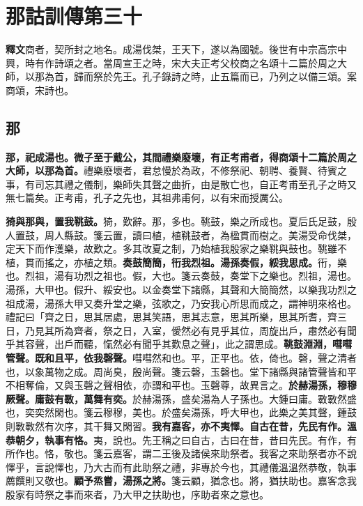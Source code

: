 \chapter{那詁訓傳第三十}

\begin{quoting}\textbf{釋文}商者，契所封之地名。成湯伐桀，王天下，遂以為國號。後世有中宗高宗中興，時有作詩頌之者。當周宣王之時，宋大夫正考父校商之名頌十二篇於周之大師，以那為首，歸而祭於先王。孔子錄詩之時，止五篇而已，乃列之以備三頌。案商頌，宋詩也。\end{quoting}

\section{那}


\textbf{那，祀成湯也。微子至于戴公，其間禮樂廢壞，有正考甫者，得商頌十二篇於周之大師，以那為首。}{\footnotesize 禮樂廢壞者，君怠慢於為政，不修祭祀、朝聘、養賢、待賓之事，有司忘其禮之儀制，樂師失其聲之曲折，由是散亡也，自正考甫至孔子之時又無七篇矣。正考甫，孔子之先也，其祖弗甫何，以有宋而授厲公。}

\textbf{猗與那與，置我鞉鼓。}{\footnotesize 猗，歎辭。那，多也。鞉鼓，樂之所成也。夏后氏足鼓，殷人置鼓，周人縣鼓。箋云置，讀曰植，植鞉鼓者，為楹貫而樹之。美湯受命伐桀，定天下而作濩樂，故歎之。多其改夏之制，乃始植我殷家之樂鞉與鼓也。鞉雖不植，貫而搖之，亦植之類。}\textbf{奏鼓簡簡，衎我烈祖。湯孫奏假，綏我思成。}{\footnotesize 衎，樂也。烈祖，湯有功烈之祖也。假，大也。箋云奏鼓，奏堂下之樂也。烈祖，湯也。湯孫，大甲也。假升、綏安也。以金奏堂下諸縣，其聲和大簡簡然，以樂我功烈之祖成湯，湯孫大甲又奏升堂之樂，弦歌之，乃安我心所思而成之，謂神明來格也。禮記曰「齊之日，思其居處，思其笑語，思其志意，思其所樂，思其所耆，齊三日，乃見其所為齊者，祭之日，入室，僾然必有見乎其位，周旋出戶，肅然必有聞乎其容聲，出戶而聽，愾然必有聞乎其歎息之聲」，此之謂思成。}\textbf{鞉鼓淵淵，嘒嘒管聲。既和且平，依我磬聲。}{\footnotesize 嘒嘒然和也。平，正平也。依，倚也。磬，聲之清者也，以象萬物之成。周尚臭，殷尚聲。箋云磬，玉磬也。堂下諸縣與諸管聲皆和平不相奪倫，又與玉磬之聲相依，亦謂和平也。玉磬尊，故異言之。}\textbf{於赫湯孫，穆穆厥聲。庸鼓有斁，萬舞有奕。}{\footnotesize 於赫湯孫，盛矣湯為人子孫也。大鍾曰庸。斁斁然盛也，奕奕然閑也。箋云穆穆，美也。於盛矣湯孫，呼大甲也，此樂之美其聲，鍾鼓則斁斁然有次序，其干舞又閑習。}\textbf{我有嘉客，亦不夷懌。自古在昔，先民有作。溫恭朝夕，執事有恪。}{\footnotesize 夷，說也。先王稱之曰自古，古曰在昔，昔曰先民。有作，有所作也。恪，敬也。箋云嘉客，謂二王後及諸侯來助祭者。我客之來助祭者亦不說懌乎，言說懌也，乃大古而有此助祭之禮，非專於今也，其禮儀溫溫然恭敬，執事薦饌則又敬也。}\textbf{顧予烝嘗，湯孫之將。}{\footnotesize 箋云顧，猶念也。將，猶扶助也。嘉客念我殷家有時祭之事而來者，乃大甲之扶助也，序助者來之意也。}

